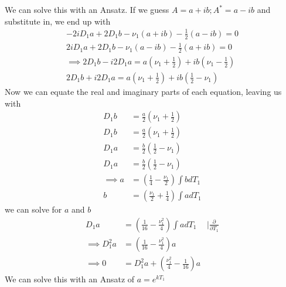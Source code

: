 \documentclass[12pt]{article}
\begin{document}
\begin{enumerate}
\begin{enumerate}
            We can solve this with an Ansatz. If we guess $A=a+ib; A^*=a-ib$ and substitute in, 
            we end up with 
            \begin{equation*}
                \begin{split}
                    -2iD_1a+2D_1b-\nu_1(a+ib)-\frac{1}{2}(a-ib)=0 \\
                    2iD_1a+2D_1b-\nu_1(a-ib)-\frac{1}{2}(a+ib)=0 \\
                    \implies 2D_1b-i2D_1a=a(\nu_1+\frac{1}{2})+ib(\nu_1-\frac{1}{2}) \\
                    2D_1b+i2D_1a=a(\nu_1+\frac{1}{2})+ib(\frac{1}{2}-\nu_1)
                \end{split}
            \end{equation*}
            Now we can equate the real and imaginary parts of each equation, leaving us with 
            \begin{equation*}
                \begin{split}
                    D_1b&=\frac{a}{2}(\nu_1+\frac{1}{2}) \\
                    D_1b&=\frac{a}{2}(\nu_1+\frac{1}{2}) \\
                    D_1a&=\frac{b}{2}(\frac{1}{2}-\nu_1) \\
                    D_1a&=\frac{b}{2}(\frac{1}{2}-\nu_1) \\
                    \implies a&=(\frac{1}{4}-\frac{\nu_1}{2})\int b dT_1 \\
                    b&=(\frac{\nu_1}{2}+\frac{1}{4})\int a dT_1
                \end{split}
            \end{equation*}
            we can solve for $a$ and $b$
            \begin{equation*}
                \begin{split}
                    D_1a&=(\frac{1}{16}-\frac{\nu_1^2}{4})\int a dT_1 \hspace{15pt} | \frac{\partial}{\partial T_1} \\
                    \implies D_1^2a&=(\frac{1}{16}-\frac{\nu_1^2}{4})a \\
                    \implies 0&= D_1^2a + (\frac{\nu_1^2}{4}-\frac{1}{16})a
                \end{split}
            \end{equation*}
            We can solve this with an Ansatz of $a = e^{kT_1}$
            \begin{equation*}

\end{equation*}
\end{enumerate}
\end{enumerate}
\end{document}
